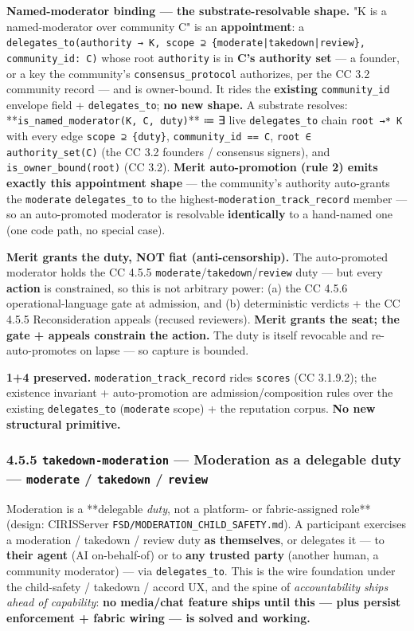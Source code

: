\documentclass[11pt]{article}
\begin{document}
\textbf{Named-moderator binding — the substrate-resolvable shape.} "K is a named-moderator over community C" is an \textbf{appointment}: a \texttt{delegates\_to(authority → K, scope ⊇ \{moderate|takedown|review\}, community\_id: C)} whose root \texttt{authority} is in \textbf{C's authority set} — a founder, or a key the community's \texttt{consensus\_protocol} authorizes, per the CC 3.2 community record — and is owner-bound. It rides the \textbf{existing} \texttt{community\_id} envelope field + \texttt{delegates\_to}; \textbf{no new shape.} A substrate resolves: **\texttt{is\_named\_moderator(K, C, duty)}** ≔ ∃ live \texttt{delegates\_to} chain \texttt{root →* K} with every edge \texttt{scope ⊇ \{duty\}}, \texttt{community\_id == C}, \texttt{root ∈ authority\_set(C)} (the CC 3.2 founders / consensus signers), and \texttt{is\_owner\_bound(root)} (CC 3.2). \textbf{Merit auto-promotion (rule 2) emits exactly this appointment shape} — the community's authority auto-grants the \texttt{moderate} \texttt{delegates\_to} to the highest-\texttt{moderation\_track\_record} member — so an auto-promoted moderator is resolvable \textbf{identically} to a hand-named one (one code path, no special case).


\textbf{Merit grants the duty, NOT fiat (anti-censorship).} The auto-promoted moderator holds the CC 4.5.5 \texttt{moderate}/\texttt{takedown}/\texttt{review} duty — but every \textbf{action} is constrained, so this is not arbitrary power: (a) the CC 4.5.6 operational-language gate at admission, and (b) deterministic verdicts + the CC 4.5.5 Reconsideration appeals (recused reviewers). \textbf{Merit grants the seat; the gate + appeals constrain the action.} The duty is itself revocable and re-auto-promotes on lapse — so capture is bounded.


\textbf{1+4 preserved.} \texttt{moderation\_track\_record} rides \texttt{scores} (CC 3.1.9.2); the existence invariant + auto-promotion are admission/composition rules over the existing \texttt{delegates\_to} (\texttt{moderate} scope) + the reputation corpus. \textbf{No new structural primitive.}


\subsubsection*{4.5.5 \texttt{takedown-moderation} — Moderation as a delegable duty — \texttt{moderate} / \texttt{takedown} / \texttt{review}}


Moderation is a **delegable \textit{duty}, not a platform- or fabric-assigned role** (design: CIRISServer \texttt{FSD/MODERATION\_CHILD\_SAFETY.md}). A participant exercises a moderation / takedown / review duty \textbf{as themselves}, or delegates it — to \textbf{their agent} (AI on-behalf-of) or to \textbf{any trusted party} (another human, a community moderator) — via \texttt{delegates\_to}. This is the wire foundation under the child-safety / takedown / accord UX, and the spine of \textit{accountability ships ahead of capability}: \textbf{no media/chat feature ships until this — plus persist enforcement + fabric wiring — is solved and working.}
\end{document}
